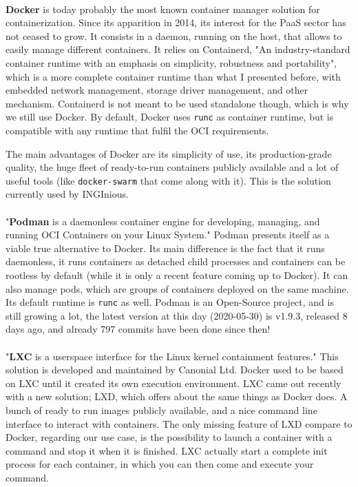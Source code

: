 \paragraph{}\textbf{Docker}\cite{merkel2014docker} is today probably the most known container manager solution for containerization.  Since its apparition in 2014, its interest for the PaaS sector has not ceased to grow.  It consists in a daemon, running on the host, that allows to easily manage different containers.  It relies on Containerd, "An industry-standard container runtime with an emphasis on simplicity, robustness and portability"\cite{containerd}, which is a more complete container runtime than what I presented before, with embedded network management, storage driver management, and other mechanism.  Containerd is not meant to be used standalone though, which is why we still use Docker.  By default, Docker uses \texttt{runc} as container runtime, but is compatible with any runtime that fulfil the OCI\cite{oci} requirements.

The main advantages of Docker are its simplicity of use, its production-grade quality, the huge fleet of ready-to-run containers publicly available and a lot of useful tools (like \texttt{docker-swarm} that come along with it).  This is the solution currently used by INGInious.

\paragraph{}"\textbf{Podman} is a daemonless container engine for developing, managing, and running OCI\cite{oci} Containers on your Linux System."\cite{podman}  Podman presents itself as a viable true alternative to Docker.  Its main difference is the fact that it runs daemonless, it runs containers as detached child processes and containers can be rootless by default (while it is only a recent feature coming up to Docker).  It can also manage pods, which are groups of containers deployed on the same machine. Its default runtime is \texttt{runc} as well.  Podman is an Open-Source project, and is still growing a lot, the latest version at this day (2020-05-30) is v1.9.3, released 8 days ago, and already 797 commits have been done since then!

\paragraph{}"\textbf{LXC} is a userspace interface for the Linux kernel containment features."\cite{lxc}  This solution is developed and maintained by Canonial Ltd.  Docker used to be based on LXC until it created its own execution environment.  LXC came out recently with a new solution; LXD, which offers about the same things as Docker does.  A bunch of ready to run images publicly available, and a nice command line interface to interact with containers.  The only missing feature of LXD compare to Docker, regarding our use case, is the possibility to launch a container with a command and stop it when it is finished.  LXC actually start a complete init process for each container, in which you can then come and execute your command.

